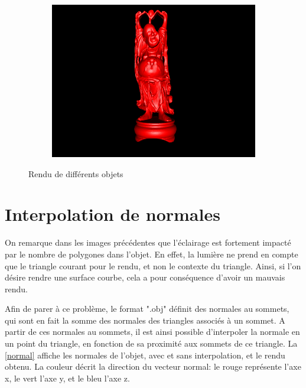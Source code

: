 \documentclass{article}
\begin{document}
\begin{figure}[hb]
  \begin{subfigure}{0.45\textwidth}
    \includegraphics[width=1\textwidth]{images/obj3.png}
  \end{subfigure}
  \caption{Rendu de différents objets\label{obj}}
\end{figure}

\section{Interpolation de normales}

On remarque dans les images précédentes que l'éclairage est fortement impacté
par le nombre de polygones dans l'objet. En effet, la lumière ne prend en
compte que le triangle courant pour le rendu, et non le contexte du triangle.
Ainsi, si l'on désire rendre une surface courbe, cela a pour conséquence
d'avoir un mauvais rendu.

Afin de parer à ce problème, le format ".obj" définit des normales au sommets,
qui sont en fait la somme des normales des triangles associés à un sommet. A
partir de ces normales au sommets, il est ainsi possible d'interpoler la
normale en un point du triangle, en fonction de sa proximité aux sommets de ce
triangle. La \cref{normal} affiche les normales de l'objet, avec et sans
interpolation, et le rendu obtenu. La couleur décrit la direction du vecteur
normal: le rouge représente l'axe x, le vert l'axe y, et le bleu l'axe z.
\end{document}
